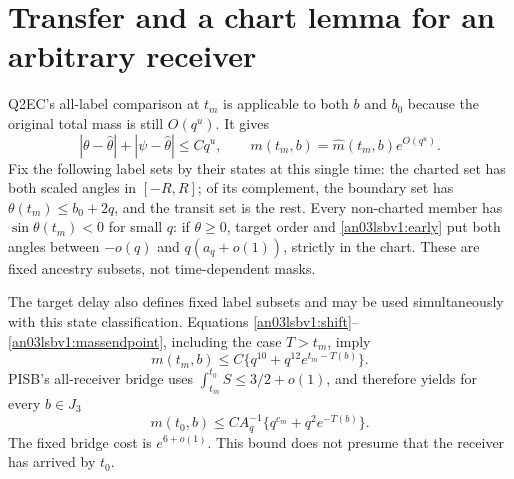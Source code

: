 \documentclass[11pt]{article}
\theoremstyle{remark}\newtheorem{remark}[theorem]{Remark}
\begin{document}
\section{Transfer and a chart lemma for an arbitrary receiver}
Q2EC's all-label comparison at $t_m$ is applicable to both $b$ and
$b_0$ because the original total mass is still $O(q^u)$. It gives
\begin{equation}
 |\theta-\widehat\theta|+|\psi-\widehat\theta|\le Cq^u,
 \qquad m(t_m,b)=\widehat m(t_m,b)e^{O(q^u)}.
 \label{an03lsbv1:early}
\end{equation}
Fix the following label sets by their states at this single time:
the charted set has both scaled angles in $[-R,R]$; of its complement,
the boundary set has $\theta(t_m)\le b_0+2q$, and the transit set is
the rest. Every non-charted member has $\sin\theta(t_m)<0$ for small
$q$: if $\theta\ge0$, target order and \eqref{an03lsbv1:early} put both
angles between $-o(q)$ and $q(a_q+o(1))$, strictly in the chart.
These are fixed ancestry subsets, not time-dependent masks.

The target delay also defines fixed label subsets and may be used
simultaneously with this state classification. Equations
\eqref{an03lsbv1:shift}--\eqref{an03lsbv1:massendpoint}, including the
case $T>t_m$, imply
\[
 m(t_m,b)\le C\{q^{10}+q^{12}e^{t_m-T(b)}\}.
\]
PISB's all-receiver bridge uses $\int_{t_m}^{t_0}S\le3/2+o(1)$, and
therefore yields for every $b\in J_3$
\begin{equation}
 m(t_0,b)\le C A_q^{-1}\{q^{c_m}+q^2e^{-T(b)}\}.
 \label{an03lsbv1:entrymass}
\end{equation}
The fixed bridge cost is $e^{6+o(1)}$. This bound does not presume
that the receiver has arrived by $t_0$.
\end{document}
